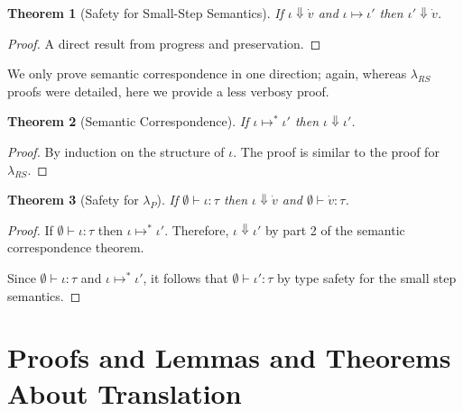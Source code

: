 \documentclass[11pt,leqno]{article}
\newtheorem{thm}{Theorem}
\theoremstyle{definition}
\newcommand{\lambdas}{\lambda_{RS}}
\newcommand{\lambdap}{\lambda_P}
\newcommand{\sreduces}{ \Downarrow }
\begin{document}
\begin{thm}[Safety for Small-Step Semantics]
If $\iota \sreduces \dot{v}$ and $\iota \mapsto \iota'$ then $\iota' \sreduces \dot{v}$. 
\end{thm}
\begin{proof}
A direct result from progress and preservation.
\end{proof}

We only prove semantic correspondence in one direction; again, whereas $\lambdas$ proofs
were detailed, here we provide a less verbosy proof.

\begin{thm}[Semantic Correspondence]
If $\iota \mapsto^* \iota'$ then $\iota \sreduces \iota'$.
\end{thm}
\begin{proof}
By induction on the structure of $\iota$.
The proof is similar to the proof for $\lambdas$.

\end{proof}

\begin{thm}[Safety for $\lambdap$] If $\emptyset \vdash \iota : \tau$ 
  then $\iota \sreduces \dot v$ and $\emptyset \vdash \dot v : \tau$.
\end{thm}
\begin{proof}
If $\emptyset \vdash \iota : \tau$ then $\iota \mapsto^* \iota'$.
Therefore, $\iota \sreduces \iota'$ by part 2 of the semantic correspondence theorem.

Since $\emptyset \vdash \iota : \tau$ and $\iota \mapsto^* \iota'$, it follows that $\emptyset \vdash \iota' : \tau$ by type safety for the small step semantics.

\end{proof}




\section{Proofs and Lemmas and Theorems About Translation}
\end{document}
